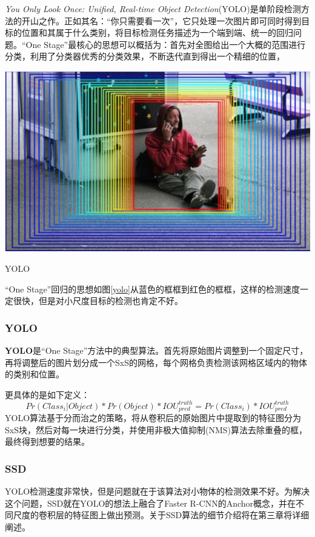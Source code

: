 \textit{You Only Look Once: Unified, Real-time Object Detection}(YOLO)\cite{yolo}是单阶段检测方法的开山之作。正如其名：“你只需要看一次”，它只处理一次图片即可同时得到目标的位置和其属于什么类别，将目标检测任务描述为一个端到端、统一的回归问题。“One Stage”最核心的思想可以概括为：首先对全图给出一个大概的范围进行分类，利用了分类器优秀的分类效果，不断迭代直到得出一个精细的位置，
\begin{uscfigure}
	\includegraphics[width=\textwidth]{./Pictures/od_regressor.png}	
	\caption{YOLO}
	\label{yolo}
\end{uscfigure}
“One Stage”回归的思想如图\ref{yolo}从蓝色的框框到红色的框框，这样的检测速度一定很快，但是对小尺度目标的检测也肯定不好。

\subsubsection{YOLO}
\textbf{YOLO}是“One Stage”方法中的典型算法。首先将原始图片调整到一个固定尺寸，再将调整后的图片划分成一个SxS的网格，每个网格负责检测该网格区域内的物体的类别和位置。

更具体的是如下定义：
\begin{equation}
	Pr(Class_i | Object) * Pr(Object) * IOU_{pred}^{truth} = Pr(Class_i) * IOU_{pred}^{truth}
\end{equation}
YOLO算法基于分而治之的策略，将从卷积后的原始图片中提取到的特征图分为SxS块，然后对每一块进行分类，并使用非极大值抑制(NMS\cite{soft-nms})算法去除重叠的框，最终得到想要的结果。
\subsubsection{SSD}
YOLO检测速度非常快，但是问题就在于该算法对小物体的检测效果不好。为解决这个问题，SSD就在YOLO的想法上融合了Faster R-CNN的Anchor概念，并在不同尺度的卷积层的特征图上做出预测。关于SSD算法的细节介绍将在第三章将详细阐述。
